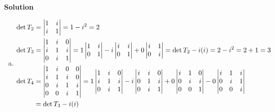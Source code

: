 \documentclass[11pt]{scrartcl}
\theoremstyle{dotlessP}
\theoremstyle{dotlessN}
\DeclarePairedDelimiter\paren{(}{)} %
\begin{document}
\textbf{Solution}
\begin{enumerate}[(a)]
	\item 
		\begin{align*}
			\det T_2 &= 
\begin{vmatrix}
	1 & i \\
	i & 1 
\end{vmatrix} = 1 - i^2 = 2 \\
			\det T_3 &= 
\begin{vmatrix}
	1 & i & 0 \\
	i & 1 & i \\
	0 & i & 1
\end{vmatrix} = 
1 
\begin{vmatrix}
	1 & i \\
	0 & 1
\end{vmatrix} - 
i 
\begin{vmatrix}
	i & i \\
	0 & 1
\end{vmatrix} + 0
\begin{vmatrix}
	i & 1 \\
	0 & i
\end{vmatrix}
= \det T_2 - i (i) = 2 - i^2 = 2 + 1 = 3 \\
			\det T_4 &= 
\begin{vmatrix}
	1 & i & 0 & 0 \\
	i & 1 & i & 0 \\
	0 & i & 1 & i \\
	0 & 0 & i & 1
\end{vmatrix} = 
1 
\begin{vmatrix}
	1 & i & 0 \\
	i & 1 & i \\
	0 & i & 1
\end{vmatrix} - i
\begin{vmatrix}
	i & i & 0 \\
	0 & 1 & i \\
	0 & i & 1
\end{vmatrix} + 
0
\begin{vmatrix}
	i & 1 & 0 \\
	0 & i & i \\
	0 & 0 & 1
\end{vmatrix} - 0
\begin{vmatrix}
	i & 1 & i \\
	0 & i & 1 \\
	0 & 0 & i
\end{vmatrix} \\
					 &= \det{T_3} - i \paren*{i 
}
\end{align*}
\end{enumerate}
\end{document}
